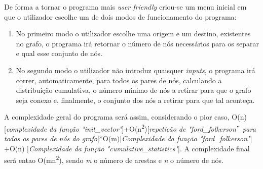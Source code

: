 \documentclass[a4paper]{article}
\begin{document}
De forma a tornar o programa mais \textit{user friendly} criou-se um menu inicial em que o utilizador escolhe um de dois modos de funcionamento do programa:

\begin{enumerate}
	\item No primeiro modo o utilizador escolhe uma origem e um destino, existentes no grafo, o programa irá retornar o número de nós necessários para os separar e qual esse conjunto de nós.
	\item No segundo modo o utilizador não introduz quaisquer \textit{inputs}, o programa irá correr, automaticamente, para todos os pares de nós, calculando a distribuição cumulativa, o número mínimo de nós a retirar para que o grafo seja conexo e, finalmente, o conjunto dos nós a retirar para que tal aconteça.
\end{enumerate}

A complexidade geral do programa será assim, considerando o pior caso, O(n)[\textit{complexidade da função "init\_vector"}]+O(n\textsuperscript{2})[\textit{repetição de "ford\_folkerson$"$ para todos os pares de nós do grafo}]*O(m)[\textit{Complexidade da função "ford\_folkerson"}] +O(n) [\textit{Complexidade da função "cumulative\_statistics"}]. A complexidade final será entao O(mn\textsuperscript{2}), sendo \textit{m} o número de arestas e \textit{n} o número de nós.
\end{document}
